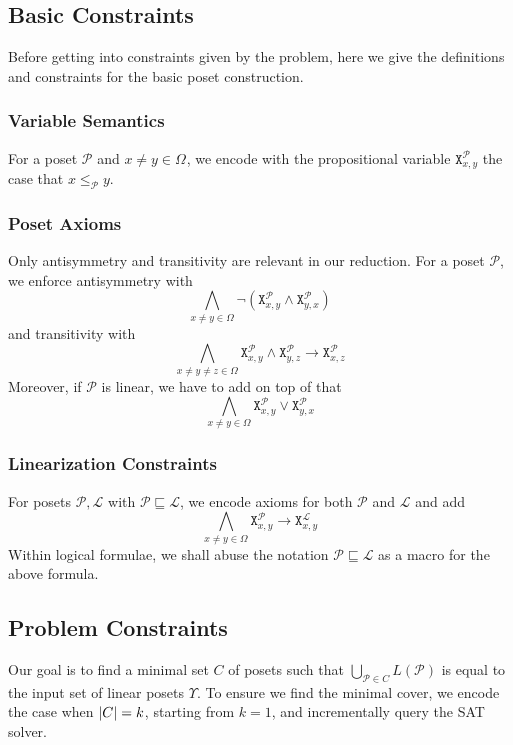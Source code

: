 \documentclass[12pt]{llncs}
\DeclarePairedDelimiter{\abs}{\lvert}{\rvert}
\let\oldleq\leq
\renewcommand{\leq}[1][]{\oldleq_{#1}}
\renewcommand{\implies}{\rightarrow}
\newcommand{\poset}[1]{\mathcal{#1}}
\newcommand{\uni}[1][]{\Omega_{#1}}
\newcommand{\lang}[1]{L(#1)}
\newcommand{\lext}{\sqsubseteq}
\newcommand{\satvar}[2]{\mathtt{X}_{#1}^{#2}}
\begin{document}
\subsection{Basic Constraints}
Before getting into constraints given by the problem, here we give the definitions and constraints for the basic poset construction.

\subsubsection{Variable Semantics}
For a poset $\poset{P}$ and $x \!\neq\! y \!\in\! \uni$, we encode with the propositional variable $\satvar{x,y}{\poset{P}}$ the case that $x \leq[\poset{P}] y$.

\subsubsection{Poset Axioms}
Only antisymmetry and transitivity are relevant in our reduction. For a poset $\poset{P}$, we enforce antisymmetry with
\[
\bigwedge_{x \neq y \in \uni} \neg (\satvar{x,y}{\poset{P}} \wedge \satvar{y,x}{\poset{P}})
\]
and transitivity with
\[
\bigwedge_{x \neq y \neq z \in \uni}
\satvar{x,y}{\poset{P}} \wedge \satvar{y,z}{\poset{P}} \implies \satvar{x,z}{\poset{P}}
\]
Moreover, if $\poset{P}$ is linear, we have to add on top of that
\[
\bigwedge_{x \neq y \in \uni} \satvar{x,y}{\poset{P}} \vee \satvar{y,x}{\poset{P}}
\]

\subsubsection{Linearization Constraints}
For posets $\poset{P},\poset{L}$ with $\poset{P} \lext \poset{L}$, we encode axioms for both $\poset{P}$ and $\poset{L}$ and add
\[
\bigwedge_{x \neq y \in \uni} \satvar{x,y}{\poset{P}} \implies \satvar{x,y}{\poset{L}}
\]
Within logical formulae, we shall abuse the notation $\poset{P} \lext \poset{L}$ as a macro for the above formula.
\label{subsubsec:linear}

\subsection{Problem Constraints}
Our goal is to find a minimal set $C$ of posets such that $\bigcup_{\poset{P} \in C} \lang{\poset{P}}$ is equal to the input set of linear posets $\Upsilon$. To ensure we find the minimal cover, we encode the case when $\abs{C} = k$, starting from $k = 1$, and incrementally query the SAT solver.
\end{document}
